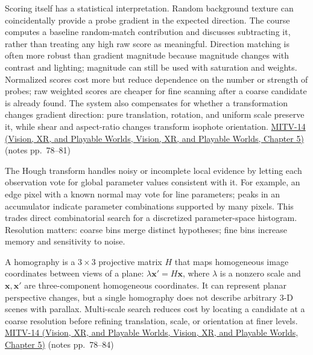 Scoring itself has a statistical interpretation. Random background texture can coincidentally provide a probe gradient in the expected direction. The course computes a baseline random-match contribution and discusses subtracting it, rather than treating any high raw score as meaningful. Direction matching is often more robust than gradient magnitude because magnitude changes with contrast and lighting; magnitude can still be used with saturation and weights. Normalized scores cost more but reduce dependence on the number or strength of probes; raw weighted scores are cheaper for fine scanning after a coarse candidate is already found. The system also compensates for whether a transformation changes gradient direction: pure translation, rotation, and uniform scale preserve it, while shear and aspect-ratio changes transform isophote orientation. \href{../07-Vision-XR-and-Playable-Worlds/main.pdf\#nameddest=04-visual-computing-ii-ch036-mitv-14---inspection-in-patquick-hough-transform-homography-position-determination-multi-scale}{MITV-14 (Vision, XR, and Playable Worlds, Vision, XR, and Playable Worlds, Chapter 5)} (notes pp.~78--81)

The Hough transform handles noisy or incomplete local evidence by letting each observation vote for global parameter values consistent with it. For example, an edge pixel with a known normal may vote for line parameters; peaks in an accumulator indicate parameter combinations supported by many pixels. This trades direct combinatorial search for a discretized parameter-space histogram. Resolution matters: coarse bins merge distinct hypotheses; fine bins increase memory and sensitivity to noise.

A homography is a \(3\times3\) projective matrix \(H\) that maps homogeneous image coordinates between views of a plane: \(\lambda\mathbf{x}'=H\mathbf{x}\), where \(\lambda\) is a nonzero scale and \(\mathbf{x},\mathbf{x}'\) are three-component homogeneous coordinates. It can represent planar perspective changes, but a single homography does not describe arbitrary 3-D scenes with parallax. Multi-scale search reduces cost by locating a candidate at a coarse resolution before refining translation, scale, or orientation at finer levels. \href{../07-Vision-XR-and-Playable-Worlds/main.pdf\#nameddest=04-visual-computing-ii-ch036-mitv-14---inspection-in-patquick-hough-transform-homography-position-determination-multi-scale}{MITV-14 (Vision, XR, and Playable Worlds, Vision, XR, and Playable Worlds, Chapter 5)} (notes pp.~78--84)

